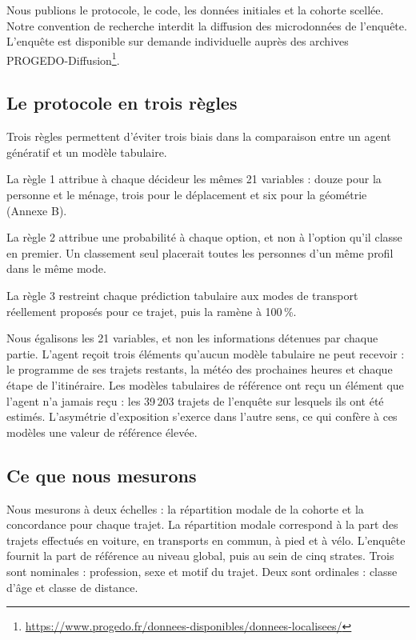 Nous publions le protocole, le code, les données initiales et la cohorte scellée. Notre convention de recherche interdit la diffusion des microdonnées de l'enquête. L'enquête est disponible sur demande individuelle auprès des archives PROGEDO-Diffusion\footnote{\url{https://www.progedo.fr/donnees-disponibles/donnees-localisees/}}.

\subsection{Le protocole en trois règles}
\label{sec:rules}

Trois règles permettent d'éviter trois biais dans la comparaison entre un agent génératif et un modèle tabulaire.

La règle 1 attribue à chaque décideur les mêmes 21 variables : douze pour la personne et le ménage, trois pour le déplacement et six pour la géométrie (Annexe B).

La règle 2 attribue une probabilité à chaque option, et non à l'option qu'il classe en premier. Un classement seul placerait toutes les personnes d'un même profil dans le même mode.

La règle 3 restreint chaque prédiction tabulaire aux modes de transport réellement proposés pour ce trajet, puis la ramène à 100\,\%.

Nous égalisons les 21 variables, et non les informations détenues par chaque partie. L'agent reçoit trois éléments qu'aucun modèle tabulaire ne peut recevoir : le programme de ses trajets restants, la météo des prochaines heures et chaque étape de l'itinéraire. Les modèles tabulaires de référence ont reçu un élément que l'agent n'a jamais reçu : les 39\,203 trajets de l'enquête sur lesquels ils ont été estimés. L'asymétrie d'exposition s'exerce dans l'autre sens, ce qui confère à ces modèles une valeur de référence élevée.

\subsection{Ce que nous mesurons}
\label{sec:quantities}

Nous mesurons à deux échelles : la répartition modale de la cohorte et la concordance pour chaque trajet. La répartition modale correspond à la part des trajets effectués en voiture, en transports en commun, à pied et à vélo. L'enquête fournit la part de référence au niveau global, puis au sein de cinq strates. Trois sont nominales : profession, sexe et motif du trajet. Deux sont ordinales : classe d'âge et classe de distance.

